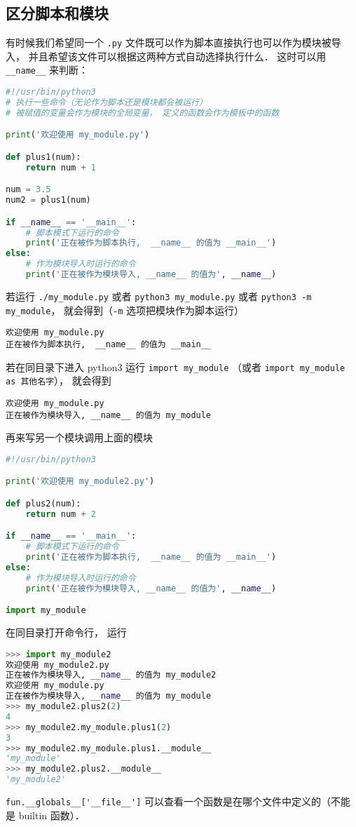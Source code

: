 
\begin{issues}
\issueDraft
\end{issues}

\subsection{区分脚本和模块}
有时候我们希望同一个 \verb|.py| 文件既可以作为脚本直接执行也可以作为模块被导入， 并且希望该文件可以根据这两种方式自动选择执行什么． 这时可以用 \verb|__name__| 来判断：
\begin{lstlisting}[language=python, caption=my\_module.py]
#!/usr/bin/python3
# 执行一些命令（无论作为脚本还是模块都会被运行）
# 被赋值的变量会作为模块的全局变量， 定义的函数会作为模板中的函数

print('欢迎使用 my_module.py')

def plus1(num):
    return num + 1

num = 3.5
num2 = plus1(num)

if __name__ == '__main__':
    # 脚本模式下运行的命令
    print('正在被作为脚本执行,  __name__ 的值为 __main__')
else:
    # 作为模块导入时运行的命令
    print('正在被作为模块导入, __name__ 的值为', __name__)
\end{lstlisting}
若运行 \verb|./my_module.py| 或者 \verb|python3 my_module.py| 或者 \verb|python3 -m my_module|， 就会得到（\verb|-m| 选项把模块作为脚本运行）
\begin{lstlisting}[language=none]
欢迎使用 my_module.py
正在被作为脚本执行,  __name__ 的值为 __main__
\end{lstlisting}
若在同目录下进入 python3 运行 \verb|import my_module| （或者 \verb|import my_module as 其他名字|）， 就会得到
\begin{lstlisting}[language=none]
欢迎使用 my_module.py
正在被作为模块导入, __name__ 的值为 my_module
\end{lstlisting}

再来写另一个模块调用上面的模块
\begin{lstlisting}[language=python,caption=my\_module2.py]
#!/usr/bin/python3

print('欢迎使用 my_module2.py')

def plus2(num):
    return num + 2

if __name__ == '__main__':
    # 脚本模式下运行的命令
    print('正在被作为脚本执行,  __name__ 的值为 __main__')
else:
    # 作为模块导入时运行的命令
    print('正在被作为模块导入, __name__ 的值为', __name__)

import my_module
\end{lstlisting}

在同目录打开命令行， 运行
\begin{lstlisting}[language=python]
>>> import my_module2
欢迎使用 my_module2.py
正在被作为模块导入, __name__ 的值为 my_module2
欢迎使用 my_module.py
正在被作为模块导入, __name__ 的值为 my_module
>>> my_module2.plus2(2)
4
>>> my_module2.my_module.plus1(2)
3
>>> my_module2.my_module.plus1.__module__
'my_module'
>>> my_module2.plus2.__module__
'my_module2'
\end{lstlisting}

\verb|fun.__globals__['__file__']| 可以查看一个函数是在哪个文件中定义的（不能是 builtin 函数）．
